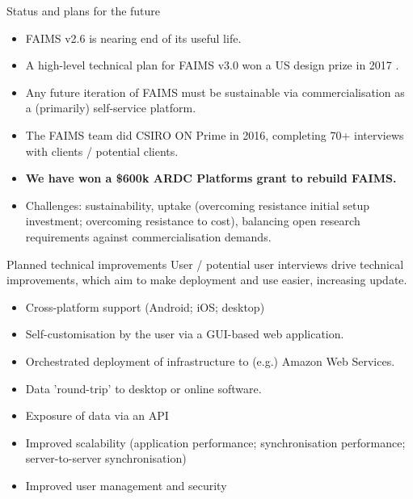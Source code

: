 \documentclass[aspectratio=169, 11pt]{beamer} %
\begin{document}
\begin{frame}{Status and plans for the future}
    \begin{itemize}[label=\textbullet]
        \item FAIMS v2.6 is nearing end of its useful life.
        \item A high-level technical plan for FAIMS v3.0 won a US design prize in 2017 \cite{Bureau_of_Reclamation2017-xl}.
        \item Any future iteration of FAIMS must be sustainable via commercialisation as a (primarily) self-service platform.
        \item The FAIMS team did CSIRO ON Prime in 2016, completing 70+ interviews with clients / potential clients.
        \item \textbf{We have won a \$600k ARDC Platforms grant to rebuild FAIMS.}
        \item Challenges: sustainability, uptake (overcoming resistance initial setup investment; overcoming resistance to cost), balancing open research requirements against commercialisation demands.
    \end{itemize}
\end{frame}

\begin{frame}{Planned technical improvements}
User / potential user interviews drive technical improvements, which aim to make deployment and use easier, increasing update.
    \begin{itemize}[label=\textbullet]
        \item Cross-platform support (Android; iOS; desktop)
        \item Self-customisation by the user via a GUI-based web application.
        \item Orchestrated deployment of infrastructure to (e.g.) Amazon Web Services.
        \item Data 'round-trip' to desktop or online software.
        \item Exposure of data via an API
        \item Improved scalability (application performance; synchronisation performance; server-to-server synchronisation)
        \item Improved user management and security
    \end{itemize}
\end{frame}
\end{document}
